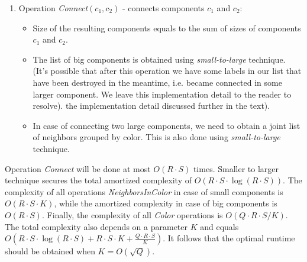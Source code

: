 \begin{enumerate}
  \item Operation \textit{Connect}$(c_1, c_2)$ - connects components $c_1$ and $c_2$:
    \begin{itemize}[topsep=0pt]
      \item Size of the resulting components equals to the sum of sizes of
            components $c_1$ and $c_2$.
      \item The list of big components is obtained using \textit{small-to-large}
            technique. (It's possible that after this operation we have some
            labels in our list that have been destroyed in the meantime, i.e.
            became connected in some larger component. We leave this implementation
            detail to the reader to resolve).
            the implementation detail discussed further in the text).
      \item In case of connecting two large components, we need to obtain a
            joint list of neighbors grouped by color. This is also done using
            \textit{small-to-large} technique.
    \end{itemize}
\end{enumerate}

Operation \textit{Connect} will be done at most $O(R \cdot S)$ times. Smaller
to larger technique secures the total amortized complexity of $O(R \cdot
S \cdot \log (R \cdot S))$. The complexity of all operations \textit{NeighborsInColor}
in case of small components is $O(R \cdot S \cdot K)$, while the amortized
complexity in case of big components is $O(R \cdot S)$. Finally, the complexity
of all \textit{Color} operations is $O(Q \cdot R \cdot S / K)$. The total
complexity also depends on a parameter $K$ and equals $O(R \cdot S \cdot
\log(R \cdot S) + R \cdot S \cdot K + \frac{Q \cdot R \cdot S}{K})$. It
follows that the optimal runtime should be obtained when $K = O(\sqrt{Q})$.
